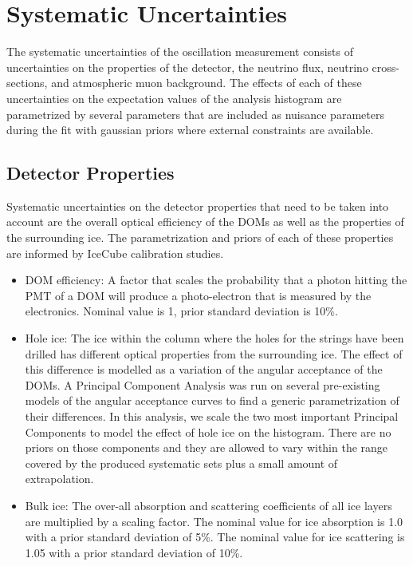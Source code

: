 \section{Systematic Uncertainties}

The systematic uncertainties of the oscillation measurement consists of uncertainties on the properties of the detector, the neutrino flux, neutrino cross-sections, and atmospheric muon background. The effects of each of these uncertainties on the expectation values of the analysis histogram are parametrized by several parameters that are included as nuisance parameters during the fit with gaussian priors where external constraints are available. 

\subsection{Detector Properties}
\label{sec:detector-unc}
Systematic uncertainties on the detector properties that need to be taken into account are the overall optical efficiency of the DOMs as well as the properties of the surrounding ice. The parametrization and priors of each of these properties are informed by IceCube calibration studies. 
\begin{itemize}
    \item DOM efficiency: A factor that scales the probability that a photon hitting the PMT of a DOM will produce a photo-electron that is measured by the electronics. Nominal value is 1, prior standard deviation is 10\%.
    \item Hole ice: The ice within the column where the holes for the strings have been drilled has different optical properties from the surrounding ice. The effect of this difference is modelled as a variation of the angular acceptance of the DOMs. A Principal Component Analysis was run on several pre-existing models of the angular acceptance curves to find a generic parametrization of their differences. In this analysis, we scale the two most important Principal Components to model the effect of hole ice on the histogram. There are no priors on those components and they are allowed to vary within the range covered by the produced systematic sets plus a small amount of extrapolation.
    \item Bulk ice: The over-all absorption and scattering coefficients of all ice layers are multiplied by a scaling factor. The nominal value for ice absorption is 1.0 with a prior standard deviation of 5\%. The nominal value for ice scattering is 1.05 with a prior standard deviation of 10\%.
\end{itemize}

